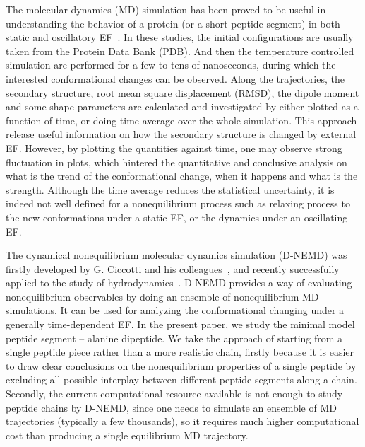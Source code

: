 \documentclass[aip,jcp,a4paper,preprint,onecolumn]{revtex4-1}
\begin{document}
The molecular dynamics (MD) simulation has been proved to be useful in
understanding the behavior of a protein (or a short peptide segment)
in both static and oscillatory EF~\cite{budi2005electric, budi2007effect, budi2008comparative,
  toschi2008effects, astrakas2011electric, astrakas2012structural,
  damm2012can, starzyk2013proteins, english2009nonequilibrium,
  solomentsev2012effects}. In these studies, the initial
configurations are usually taken from the Protein Data Bank (PDB).
And then the temperature controlled simulation are performed for 
a few to tens of nanoseconds, during which the interested
conformational changes can be observed. Along the trajectories, the
secondary structure, root mean square displacement (RMSD), the dipole
moment and some shape parameters are calculated and investigated by
either plotted as a function of time, or doing time average over the
whole simulation. This approach release useful information on how the
secondary structure is changed by external  EF.  However,
by plotting the quantities against time, one may observe strong
fluctuation in plots, which hintered the quantitative and conclusive
analysis on what is the trend of the conformational change, when
it happens and what is the strength.
Although the time average reduces the statistical uncertainty,
it is indeed not well defined for a nonequilibrium process
such as relaxing process to the new conformations under a static
EF, or the dynamics under an oscillating EF.

The dynamical nonequilibrium molecular dynamics simulation (D-NEMD)
was firstly developed by G. Ciccotti and his
colleagues~\cite{ciccotti1975direct, ciccotti1979thought}, and
recently successfully applied to the study of
hydrodynamics~\cite{orlandini2011hydrodynamics,
  orlandini2011hydrodynamics-01}. D-NEMD provides a way of evaluating
nonequilibrium observables by doing an ensemble of nonequilibrium MD
simulations.  It can be used for analyzing the
conformational changing under a generally time-dependent EF.
In the present paper, we study the minimal model peptide
segment -- alanine dipeptide. We take the approach of starting from a
single peptide piece rather than a more realistic chain, firstly because it
is easier to draw clear conclusions on the nonequilibrium properties
of a single peptide by excluding all possible interplay between
different peptide segments along a chain.
Secondly, the current computational resource available is not enough
to study peptide chains by D-NEMD, since one needs to simulate an
ensemble of MD trajectories (typically a few thousands), so it
requires much higher computational cost than producing a single
equilibrium MD trajectory.
\end{document}
